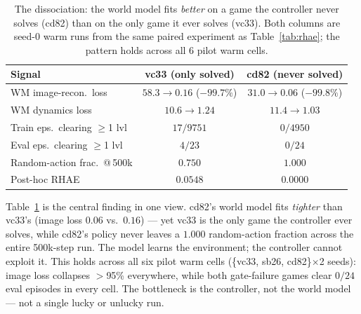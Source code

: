 \documentclass[10pt]{article}
\begin{document}
\begin{table}[h]
\centering
\small
\caption{The dissociation: the world model fits \emph{better} on a game the
controller never solves (cd82) than on the only game it ever solves (vc33).
Both columns are seed-0 warm runs from the same paired experiment as
Table~\ref{tab:rhae}; the pattern holds across all 6 pilot warm cells.}
\label{tab:diag}
\begin{tabular}{lcc}
\toprule
Signal & vc33 (only solved) & cd82 (never solved) \\
\midrule
WM image-recon.\ loss & $58.3 \to 0.16$ ($-99.7\%$) & $31.0 \to \mathbf{0.06}$ ($-99.8\%$) \\
WM dynamics loss & $10.6 \to 1.24$ & $11.4 \to 1.03$ \\
Train eps.\ clearing $\ge$1 lvl & $17/9751$ & $0/4950$ \\
Eval eps.\ clearing $\ge$1 lvl & $4/23$ & $0/24$ \\
Random-action frac.\ @\,500k & $0.750$ & $\mathbf{1.000}$ \\
Post-hoc RHAE & $0.0548$ & $0.0000$ \\
\bottomrule
\end{tabular}
\end{table}

\vspace{-0.4em}
Table~\ref{tab:diag} is the central finding in one view. cd82's world model
fits \emph{tighter} than vc33's (image loss $0.06$ vs.\ $0.16$) --- yet vc33 is
the only game the controller ever solves, while cd82's policy never leaves a
$1.000$ random-action fraction across the entire 500k-step run. The model
learns the environment; the controller cannot exploit it. This holds across all
six pilot warm cells (\{vc33, sb26, cd82\}$\times$2 seeds): image loss collapses
$>$95\% everywhere, while both gate-failure games clear $0/24$ eval episodes in
every cell. The bottleneck is the controller, not the world model --- not a
single lucky or unlucky run.
\end{document}
